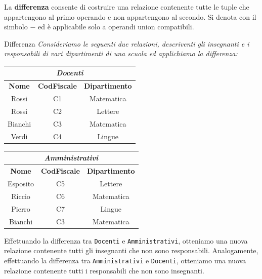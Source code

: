 \begin{redbar}
    La \textbf{differenza} consente di costruire una relazione contenente tutte le tuple che appartengono al primo operando e non appartengono al secondo. Si denota con il simbolo $-$ ed è applicabile solo a operandi union compatibili.
\end{redbar}

\begin{Example}{Differenza}{}
    \textit{Consideriamo le seguenti due relazioni, descriventi gli insegnanti e i responsabili di vari dipartimenti di una scuola ed applichiamo la differenza:}
    \begin{center}
        \begin{tabular}{|c|c|c|}
            \hline\multicolumn{3}{|c|}{\textit{Docenti}}\\\hline
            \textbf{Nome} & \textbf{CodFiscale} & \textbf{Dipartimento}\\\hline
            Rossi & C1 & Matematica\\
            Rossi & C2 & Lettere\\
            Bianchi & C3 & Matematica\\
            Verdi & C4 & Lingue\\\hline
        \end{tabular}
        \begin{tabular}{|c|c|c|}
            \hline\multicolumn{3}{|c|}{\textit{Amministrativi}}\\\hline
            \textbf{Nome} & \textbf{CodFiscale} & \textbf{Dipartimento}\\\hline
            Esposito & C5 & Lettere\\
            Riccio & C6 & Matematica\\
            Pierro & C7 & Lingue\\
            Bianchi & C3 & Matematica\\\hline
        \end{tabular}
        \bigskip
    \end{center}
    Effettuando la differenza tra \verb|Docenti| e \verb|Amministrativi|, otteniamo una nuova relazione contenente tutti gli insegnanti che non sono responsabili. Analogamente, effettuando la differenza tra \verb|Amministrativi| e \verb|Docenti|, otteniamo una nuova relazione contenente tutti i responsabili che non sono insegnanti.
    \begin{center}

\end{center}
\end{Example}
